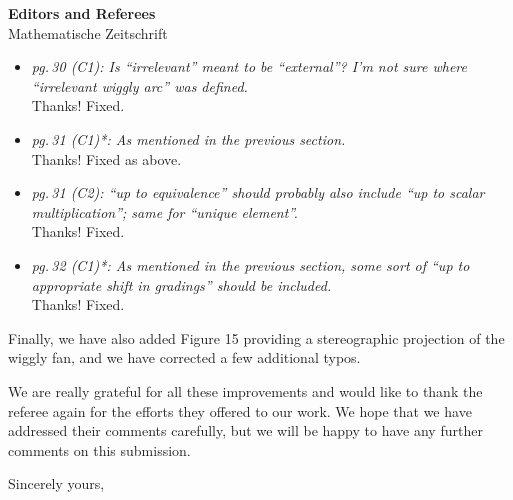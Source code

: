\documentclass{letter}
\begin{document}
\begin{letter}{{\bf Editors and Referees} \\ Mathematische Zeitschrift}
\begin{itemize}
\item \textsl{\color{gray} pg.\,30 (C1): Is ``irrelevant'' meant to be ``external''? I’m not sure where ``irrelevant wiggly arc'' was defined.} \\
Thanks! Fixed.

\item \textsl{\color{gray} pg.\,31 (C1)*: As mentioned in the previous section.} \\
Thanks! Fixed as above.

\item \textsl{\color{gray} pg.\,31 (C2): ``up to equivalence'' should probably also include ``up to scalar multiplication''; same for ``unique element''.} \\
Thanks! Fixed.

\item \textsl{\color{gray} pg.\,32 (C1)*: As mentioned in the previous section, some sort of ``up to appropriate shift in gradings'' should be included.} \\
Thanks! Fixed.

\end{itemize}

Finally, we have also added Figure 15 providing a stereographic projection of the wiggly fan, and we have corrected a few additional typos.

We are really grateful for all these improvements and would like to thank the referee again for the efforts they offered to our work. We hope that we have addressed their comments carefully, but we will be happy to have any further comments on this submission.

%

\closing{Sincerely yours,}

\end{letter}
\end{document}
